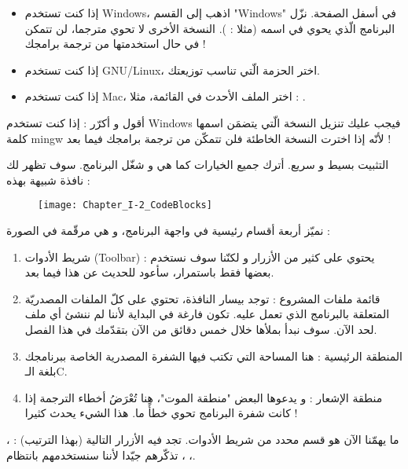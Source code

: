 \begin{itemize}
  \item إذا كنت تستخدم
\textenglish{Windows}،
اذهب إلى القسم
"\textenglish{Windows}"
في أسفل الصفحة. نزّل البرنامج الّذي يحوي
في اسمه (مثلا :
).
النسخة الأخرى لا تحوي مترجما، لن تتمكن في حال استخدمتها من ترجمة برامجك !
  \item إذا كنت تستخدم
\textenglish{GNU/Linux}،
اختر الحزمة الّتي تناسب توزيعتك.

  \item إذا كنت تستخدم
\textenglish{Mac}،
اختر الملف الأحدث في القائمة، مثلا :
.

\end{itemize}

\begin{critical}
أقول و أكرّر : إذا كنت تستخدم
\textenglish{Windows}
فيجب عليك تنزيل النسخة الّتي يتضمَن اسمها كلمة
\textenglish{mingw}
لأنّه إذا اخترت النسخة الخاطئة فلن تتمكّن من ترجمة برامجك فيما بعد !
\end{critical}

التثبيت بسيط و سريع.  أترك جميع الخيارات كما هي و شغّل البرنامج. سوف تظهر لك نافذة شبيهة بهذه :

\begin{figure}[H]
	\centering
	\texttt{[image: Chapter\_I-2\_CodeBlocks]}
\end{figure}

نميّز أربعة أقسام رئيسية في واجهة البرنامج، و هي مرقّمة في الصورة :

\begin{enumerate}
  \item شريط الأدوات
(\textenglish{Toolbar}) :
يحتوي على كثير من الأزرار و لكنّنا سوف نستخدم بعضها فقط باستمرار، سأعود للحديث عن هذا فيما بعد.
  \item قائمة ملفات المشروع : توجد بيسار النافذة، تحتوي على كلّ الملفات المصدريّة المتعلقة بالبرنامج الذي تعمل عليه. تكون فارغة في البداية لأننا لم ننشئ أي ملف لحد الآن. سوف نبدأ بملأها خلال خمس دقائق من الآن بتقدّمك في هذا الفصل.
  \item المنطقة الرئيسية : هنا المساحة التي تكتب فيها الشفرة المصدرية الخاصة ببرنامجك بلغة الـ\textenglish{C}.
  \item منطقة الإشعار : و يدعوها البعض "منطقة الموت"، هنا تُعْرَضُ أخطاء الترجمة إذا كانت شفرة البرنامج تحوي خطأً ما. هذا الشيء يحدث كثيرا !
\end{enumerate}

ما يهمّنا الآن هو قسم محدد من شريط الأدوات. تجد فيه الأزرار التالية (بهذا الترتيب) :
،
،
،
تذكّرهم جيّدا لأننا سنستخدمهم بانتظام.


